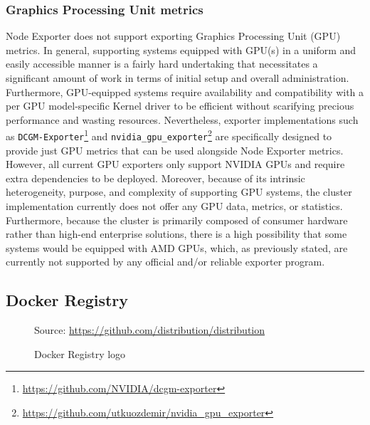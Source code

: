 \subsubsection{Graphics Processing Unit metrics}
\label{subsubsec:implementation_dependencies_node_exporter_graphics_processing_unit_metrics}

Node Exporter does not support exporting Graphics Processing Unit (GPU) metrics.
In general, supporting systems equipped with GPU(s) in a uniform and easily accessible
manner is a fairly hard undertaking that necessitates a significant amount of work
in terms of initial setup and overall administration. Furthermore, GPU-equipped systems
require availability and compatibility with a per GPU model-specific Kernel driver
to be efficient without scarifying precious performance and wasting resources.
Nevertheless, exporter implementations such as \texttt{DCGM-Exporter}\footnote{\url{https://github.com/NVIDIA/dcgm-exporter}}
and \texttt{nvidia\_gpu\_exporter}\footnote{\url{https://github.com/utkuozdemir/nvidia_gpu_exporter}}
are specifically designed to provide just GPU metrics that can be used alongside
Node Exporter metrics. However, all current GPU exporters only support NVIDIA GPUs
and require extra dependencies to be deployed. Moreover, because of its intrinsic
heterogeneity, purpose, and complexity of supporting GPU systems, the cluster
implementation currently does not offer any GPU data, metrics, or statistics. Furthermore,
because the cluster is primarily composed of consumer hardware rather than high-end
enterprise solutions, there is a high possibility that some systems would be equipped
with AMD GPUs, which, as previously stated, are currently not supported by any
official and/or reliable exporter program.

\subsection{Docker Registry}
\label{subsec:implementation_dependencies_docker_registry}

\begin{figure} %
  \centering
  \def\stackalignment{l} %
  {\scriptsize \parbox[t]{\linewidth}{ Source: \url{https://github.com/distribution/distribution}} }
  \caption{Docker Registry logo}
\end{figure}

